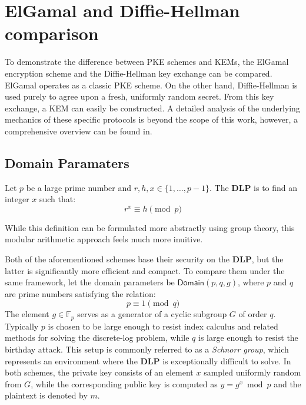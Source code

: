 \section{ElGamal and Diffie-Hellman comparison}

To demonstrate the difference between PKE schemes and KEMs, the ElGamal encryption scheme and the Diffie-Hellman key exchange can be compared. ElGamal operates as a classic PKE scheme. On the other hand, Diffie-Hellman is used purely to agree upon a fresh, uniformly random secret. From this key exchange, a KEM can easily be constructed. A detailed analysis of the underlying mechanics of these specific protocols is beyond the scope of this work, however, a comprehensive overview can be found in\cite{HoffsteinPipherSilverman}.


\subsection{Domain Paramaters}

\begin{definition}
Let $p$ be a large prime number and $r, h, x \in \{1, \dots, p-1\}$. The \textbf{DLP} is to find an integer $x$ such that:
\[
r^x \equiv h \pmod p
\]
\end{definition}

While this definition can be formulated more abstractly using group theory, this modular arithmetic approach feels much more inuitive.

Both of the aforementioned schemes base their security on the \textbf{DLP}, but the latter is significantly more efficient and compact. To compare them under the same framework, let the domain parameters be $\mathsf{Domain}(p, q, g)$, where $p$ and $q$ are prime numbers satisfying the relation:
\[
p \equiv 1 \pmod q
\]
The element $g \in \mathbb{F}_p$ serves as a generator of a cyclic subgroup $G$ of order $q$. Typically $p$ is chosen to be large enough to resist index calculus and related methods for solving the discrete-log problem, while $q$ is large enough to resist the birthday attack. This setup is commonly referred to as a \textit{Schnorr group}, which represents an environment where the \textbf{DLP} is exceptionally difficult to solve. In both schemes, the private key consists of an element $x$ sampled uniformly random from $G$, while the corresponding public key is computed as $y=g^x \bmod p$ and the plaintext is denoted by $m$.


